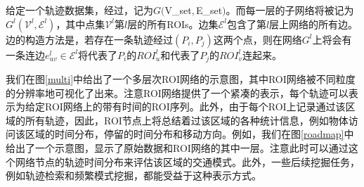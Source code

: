 \begin{dingyi}[多层次ROI网络]
给定一个轨迹数据集，经过，记为$G($\gls{V_set}$,$\gls{E_set}$)$。而每一层的子网络将被记为$G^l(\mathcal{V}^l,\mathcal{E}^l)$，其中点集$\mathcal{V}^l$第$l$层的所有ROIs。边集$\mathcal{E}^l$包含了第$l$层上网络的所有边。边的构造方法是，若存在一条轨迹经过$(P_{i}, P_{j})$这两个点，则在网络$G^l$上将会有一条连边$e^l_{uv}\in \mathcal{E}^l$将代表了$P_i$的${ROI}^l_u$和代表了$P_j$的${ROI}^l_v$连起来。
\end{dingyi}



我们在图\ref{multi}中给出了一个多层次ROI网络的示意图，其中ROI网络被不同粒度的分辨率地可视化了出来。注意ROI网络提供了一个紧凑的表示，每个轨迹可以表示为给定ROI网络上的带有时间的ROI序列。此外，由于每个ROI上记录通过该区域的所有轨迹，因此，ROI节点上将总结着过该区域的各种统计信息，例如物体访问该区域的时间分布，停留的时间分布和移动方向。例如，我们在图\ref{roadmap}中给出了一个示意图，显示了原始数据和ROI网络的其中一层。注意此时可以通过这个网络节点的轨迹时间分布来评估该区域的交通模式。此外，一些后续挖掘任务，例如轨迹检索和频繁模式挖掘，都能受益于这种表示方式。



